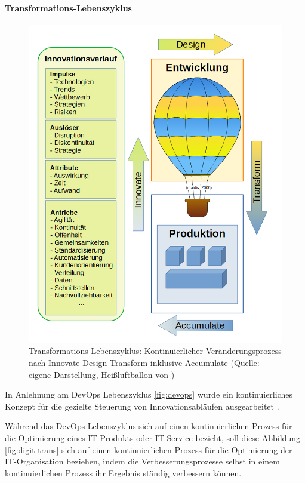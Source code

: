  \paragraph{Transformations-Lebenszyklus}
 \begin{figure}[htbp]
 \centering
 \includegraphics[width=1.0\textwidth]{gfx/digital-transformation-lifecycle-by-selim4.PNG}
 \caption{Transformations-Lebenszyklus: Kontinuierlicher Veränderungsprozess nach Innovate-Design-Transform inklusive Accumulate (Quelle: eigene Darstellung, Heißluftballon von \citet{maidis_2006})\label{fig:digit-trans-idt}
 }
 \end{figure}

In Anlehnung am DevOps Lebenszyklus \ref{fig:devops} \cite{Alt2017} wurde ein kontinuierliches Konzept für die gezielte Steuerung von Innovationsabläufen ausgearbeitet \cite{Ganswindt2006}.

Während das DevOps Lebenszyklus \cite{Alt2017} sich auf einen kontinuierlichen Prozess für die Optimierung eines IT-Produkts oder IT-Service bezieht, soll diese Abbildung \ref{fig:digit-trans} sich auf einen kontinuierlichen Prozess für die Optimierung der IT-Organisation beziehen, indem die Verbesserungsprozesse selbst in einem kontinuierlichen Prozess ihr Ergebnis ständig verbessern können.
 
